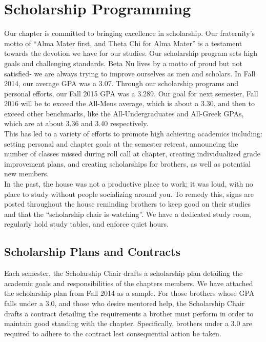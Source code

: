 \chapter{Scholarship Programming}

  Our chapter is committed to bringing excellence in scholarship. Our fraternity's motto of ``Alma Mater first, and Theta Chi for Alma Mater'' is a testament towards the devotion we have for our studies. Our scholarship program sets high goals and challenging standards. Beta Nu lives by a motto of proud but not satisfied- we are always trying to improve ourselves as men and scholars. In Fall 2014, our average GPA was a 3.07. Through our scholarship programs and personal efforts, our Fall 2015 GPA was a 3.289. Our goal for next semester, Fall 2016 will be to exceed the All-Mens average, which is about a 3.30, and then to exceed other benchmarks, like the All-Undergraduates and All-Greek GPAs, which are at about 3.36 and 3.40 respectively.\\ 

  This has led to a variety of efforts to promote high achieving academics including: setting personal and chapter goals at the semester retreat, announcing the number of classes missed during roll call at chapter, creating individualized grade improvement plans, and creating scholarships for brothers, as well as potential new members. \\

  In the past, the house was not a productive place to work; it was loud, with no place to study without people socializing around you. To remedy this, signs are posted throughout the house reminding brothers to keep good on their studies and that the ``scholarship chair is watching''. We have a dedicated study room, regularly hold study tables, and enforce quiet hours.    
  
  \section*{Scholarship Plans and Contracts}
    Each semester, the Scholarship Chair drafts a scholarship plan detailing the academic goals and responsibilities of the chapters members. We have attached the scholarship plan from Fall 2014 as a sample. For those brothers whose GPA falls under a 3.0, and those who desire mentored help, the Scholarship Chair drafts a contract detailing the requirements a brother must perform in order to maintain good standing with the chapter. Specifically, brothers under a 3.0 are required to adhere to the contract lest consequential action be taken. \\

